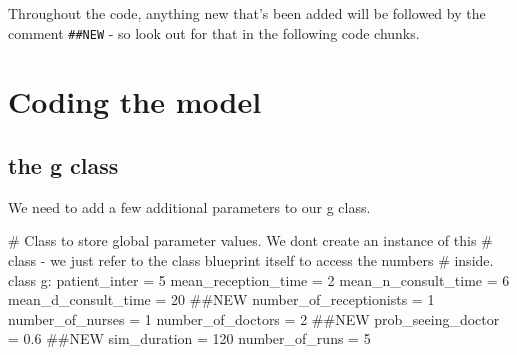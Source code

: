 \documentclass[
  letterpaper,
  DIV=11,
  numbers=noendperiod]{scrreprt}
\newenvironment{Shaded}{}{}
\newcommand{\CommentTok}[1]{\textcolor[rgb]{0.42,0.45,0.49}{#1}}
\newcommand{\DecValTok}[1]{\textcolor[rgb]{0.00,0.36,0.77}{#1}}
\newcommand{\FloatTok}[1]{\textcolor[rgb]{0.00,0.36,0.77}{#1}}
\newcommand{\KeywordTok}[1]{\textcolor[rgb]{0.84,0.23,0.29}{#1}}
\newcommand{\NormalTok}[1]{\textcolor[rgb]{0.14,0.16,0.18}{#1}}
\newcommand{\OperatorTok}[1]{\textcolor[rgb]{0.14,0.16,0.18}{#1}}
\begin{document}
\begin{tcolorbox}[enhanced jigsaw, colframe=quarto-callout-tip-color-frame, bottomtitle=1mm, breakable, rightrule=.15mm, coltitle=black, colbacktitle=quarto-callout-tip-color!10!white, opacityback=0, leftrule=.75mm, arc=.35mm, toptitle=1mm, title=\textcolor{quarto-callout-tip-color}{\faLightbulb}\hspace{0.5em}{Tip}, titlerule=0mm, colback=white, toprule=.15mm, bottomrule=.15mm, left=2mm, opacitybacktitle=0.6]

Throughout the code, anything new that's been added will be followed by
the comment \texttt{\#\#NEW} - so look out for that in the following
code chunks.

\end{tcolorbox}

\section{Coding the model}\label{coding-the-model-1}

\subsection{the g class}\label{the-g-class-1}

We need to add a few additional parameters to our g class.

\begin{Shaded}
\begin{Highlighting}[]
\CommentTok{\# Class to store global parameter values.  We don\textquotesingle{}t create an instance of this}
\CommentTok{\# class {-} we just refer to the class blueprint itself to access the numbers}
\CommentTok{\# inside.}
\KeywordTok{class}\NormalTok{ g:}
\NormalTok{    patient\_inter }\OperatorTok{=} \DecValTok{5}
\NormalTok{    mean\_reception\_time }\OperatorTok{=} \DecValTok{2}
\NormalTok{    mean\_n\_consult\_time }\OperatorTok{=} \DecValTok{6}
\NormalTok{    mean\_d\_consult\_time }\OperatorTok{=} \DecValTok{20} \CommentTok{\#\#NEW}
\NormalTok{    number\_of\_receptionists }\OperatorTok{=} \DecValTok{1}
\NormalTok{    number\_of\_nurses }\OperatorTok{=} \DecValTok{1}
\NormalTok{    number\_of\_doctors }\OperatorTok{=} \DecValTok{2} \CommentTok{\#\#NEW}
\NormalTok{    prob\_seeing\_doctor }\OperatorTok{=} \FloatTok{0.6} \CommentTok{\#\#NEW}
\NormalTok{    sim\_duration }\OperatorTok{=} \DecValTok{120}
\NormalTok{    number\_of\_runs }\OperatorTok{=} \DecValTok{5}
\end{Highlighting}
\end{Shaded}
\end{document}
